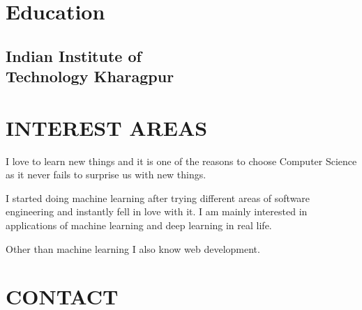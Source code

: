 \documentclass[]{deedy-resume-openfont}
\begin{document}
%
%
%
%

\begin{minipage}[t]{0.33\textwidth} 


\section{Education} 

\subsection{Indian Institute of \\ Technology Kharagpur}
\sectionsep


\section{INTEREST AREAS}
I love to learn new things and it is one of the reasons to choose Computer Science as it never fails to surprise us with new things.

I started doing machine learning after trying different areas of software engineering and instantly fell in love with it.
I am mainly interested in applications of machine learning and deep learning in real life.

Other than machine learning I also know web development.

\sectionsep


\section{CONTACT} 
\sectionsep


\end{minipage}
\end{document}
